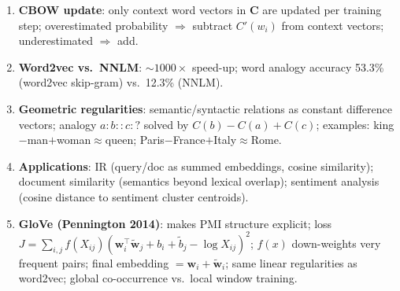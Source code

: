 \documentclass[11pt,a4paper]{article}
\begin{document}
\begin{tcolorbox}[colback=WarningRedBg,colframe=WarningRed,boxrule=0.8pt,arc=3pt]
\begin{enumerate}
  \item \textbf{CBOW update}: only context word vectors in $\mathbf{C}$ are updated per training step; overestimated probability $\Rightarrow$ subtract $C'(w_i)$ from context vectors; underestimated $\Rightarrow$ add.
  \item \textbf{Word2vec vs.\ NNLM}: $\sim\!1000\times$ speed-up; word analogy accuracy 53.3\% (word2vec skip-gram) vs.\ 12.3\% (NNLM).
  \item \textbf{Geometric regularities}: semantic/syntactic relations as constant difference vectors; analogy $a:b::c:?$ solved by $C(b)-C(a)+C(c)$; examples: king$-$man$+$woman$\approx$queen; Paris$-$France$+$Italy$\approx$Rome.
  \item \textbf{Applications}: IR (query/doc as summed embeddings, cosine similarity); document similarity (semantics beyond lexical overlap); sentiment analysis (cosine distance to sentiment cluster centroids).
  \item \textbf{GloVe (Pennington 2014)}: makes PMI structure explicit; loss $J = \sum_{i,j} f(X_{ij})({\mathbf{w}_i^\top\tilde{\mathbf{w}}_j + b_i + \tilde{b}_j - \log X_{ij}})^2$; $f(x)$ down-weights very frequent pairs; final embedding $= \mathbf{w}_i + \tilde{\mathbf{w}}_i$; same linear regularities as word2vec; global co-occurrence vs.\ local window training.
\end{enumerate}
\end{tcolorbox}
\end{document}
